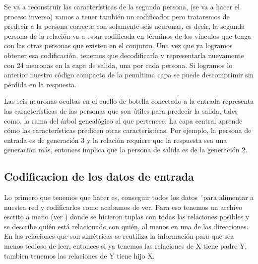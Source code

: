  Se va a reconstruir las características de la segunda persona, (se va a hacer el proceso inverso) vamos a tener también un codificador pero  trataremos de predecir a la persona correcta con solamente seis neuronas, es decir, la segunda persona de la relación va a estar codificada en términos de los vínculos que tenga con las otras personas que existen en el conjunto. Una vez que ya logramos obtener esa codificación, tenemos que decodificarla y representarla nuevamente con 24 neuronas en la capa de salida, una por cada persona. Si logramos lo anterior nuestro código compacto de la penultima capa se puede descomprimir sin pérdida en la respuesta.

Las seis neuronas ocultas en el cuello de botella conectado a la entrada representa las características de las personas que son útiles para predecir la salida, tales como, la rama del árbol genealógico al que pertenece.
La capa central aprende cómo las características predicen otras características. Por ejemplo, la persona de entrada es de generación 3 y la relación requiere que la respuesta sea una generación más, entonces implica que la persona de salida es de la generación 2.

  
\subsection{Codificacion de los datos de entrada}

Lo primero que tenemos que hacer es, conseguir todos los datos ´para alimentar a nuestra red y codificarlos como acabamos de ver. Para eso tenemos un archivo escrito a mano (ver ) donde se hicieron tuplas con todas las relaciones posibles y se describe quién está relacionado con quién, al menos en una de las direcciones. En las relaciones que son simétricas se reutiliza la información para que sea menos tedioso de leer, entonces si ya tenemos las relaciones de X tiene padre Y, tambien tenemos las relaciones de Y tiene hijo X.

